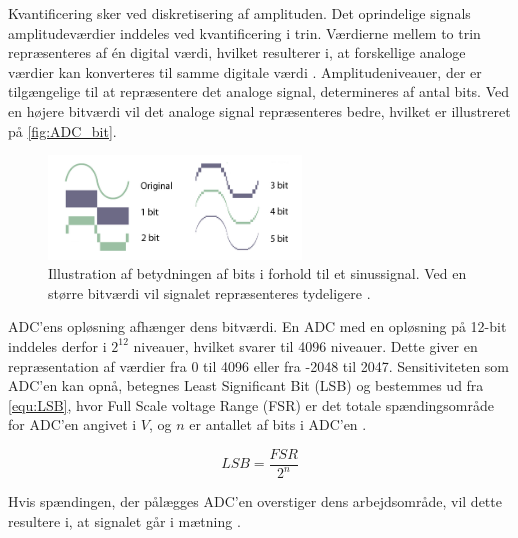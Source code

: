 Kvantificering sker ved diskretisering af amplituden. 
Det oprindelige signals amplitudeværdier inddeles ved kvantificering i trin. 
Værdierne mellem to trin repræsenteres af én digital værdi, hvilket resulterer i, at forskellige analoge værdier kan konverteres til samme digitale værdi \citep{morre2003}. 
Amplitudeniveauer, der er tilgængelige til at repræsentere det analoge signal, determineres af antal bits. 
Ved en højere bitværdi vil det analoge signal repræsenteres bedre, hvilket er illustreret på \autoref{fig:ADC_bit}.

\begin{figure}[H]
\centering
\includegraphics[width=0.6\textwidth]{figures/problemloesning/ADC_bit}
\caption{Illustration af betydningen af bits i forhold til et sinussignal. Ved en større bitværdi vil signalet repræsenteres tydeligere \citep{adc2010}.}
\label{fig:ADC_bit}
\end{figure}

\noindent
ADC'ens opløsning afhænger dens bitværdi. En ADC med en opløsning på 12-bit inddeles derfor i ${2}^{12}$ niveauer, hvilket svarer til 4096 niveauer. 
Dette giver en repræsentation af værdier fra 0 til 4096 eller fra -2048 til 2047. 
Sensitiviteten som ADC'en kan opnå, betegnes Least Significant Bit (LSB) og bestemmes ud fra \autoref{equ:LSB}, hvor Full Scale voltage Range (FSR) er det totale spændingsområde for ADC'en angivet i $V$, og $n$ er antallet af bits i ADC'en \citep{webster1998, wolf2004}.

\begin{equation} \label{equ:LSB}
LSB=\dfrac{FSR}{2^{n}}
\end{equation}

\noindent
Hvis spændingen, der pålægges ADC'en overstiger dens arbejdsområde, vil dette resultere i, at signalet går i mætning \citep{webster1998, wolf2004}. 


